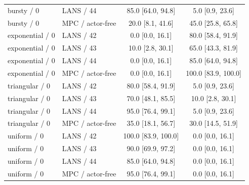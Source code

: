 \begin{longtable}{llcc}
bursty / 0 & LANS / 44 & 85.0 [64.0, 94.8] & 5.0 [0.9, 23.6] \\
bursty / 0 & MPC / actor-free & 20.0 [8.1, 41.6] & 45.0 [25.8, 65.8] \\
exponential / 0 & LANS / 42 & 0.0 [0.0, 16.1] & 80.0 [58.4, 91.9] \\
exponential / 0 & LANS / 43 & 10.0 [2.8, 30.1] & 65.0 [43.3, 81.9] \\
exponential / 0 & LANS / 44 & 0.0 [0.0, 16.1] & 85.0 [64.0, 94.8] \\
exponential / 0 & MPC / actor-free & 0.0 [0.0, 16.1] & 100.0 [83.9, 100.0] \\
triangular / 0 & LANS / 42 & 80.0 [58.4, 91.9] & 5.0 [0.9, 23.6] \\
triangular / 0 & LANS / 43 & 70.0 [48.1, 85.5] & 10.0 [2.8, 30.1] \\
triangular / 0 & LANS / 44 & 95.0 [76.4, 99.1] & 5.0 [0.9, 23.6] \\
triangular / 0 & MPC / actor-free & 35.0 [18.1, 56.7] & 30.0 [14.5, 51.9] \\
uniform / 0 & LANS / 42 & 100.0 [83.9, 100.0] & 0.0 [0.0, 16.1] \\
uniform / 0 & LANS / 43 & 90.0 [69.9, 97.2] & 0.0 [0.0, 16.1] \\
uniform / 0 & LANS / 44 & 85.0 [64.0, 94.8] & 0.0 [0.0, 16.1] \\
uniform / 0 & MPC / actor-free & 95.0 [76.4, 99.1] & 0.0 [0.0, 16.1] \\
\bottomrule
\end{longtable}
